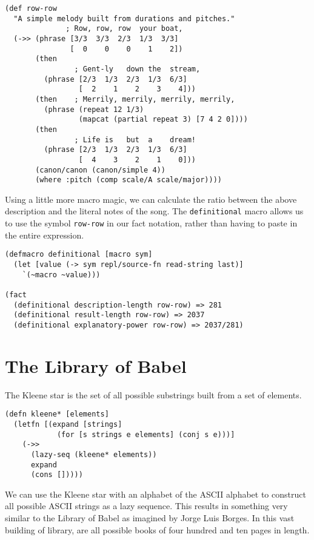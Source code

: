 \documentclass[numbers]{sigplanconf}
\begin{document}
\begin{verbatim}
(def row-row
  "A simple melody built from durations and pitches."
              ; Row, row, row  your boat,
  (->> (phrase [3/3  3/3  2/3  1/3  3/3]
               [  0    0    0    1    2])
       (then
                ; Gent-ly   down the  stream,
         (phrase [2/3  1/3  2/3  1/3  6/3]
                 [  2    1    2    3    4]))
       (then    ; Merrily, merrily, merrily, merrily,
         (phrase (repeat 12 1/3)
                 (mapcat (partial repeat 3) [7 4 2 0])))
       (then
                ; Life is   but  a    dream!
         (phrase [2/3  1/3  2/3  1/3  6/3]
                 [  4    3    2    1    0]))
       (canon/canon (canon/simple 4))
       (where :pitch (comp scale/A scale/major))))
\end{verbatim}

Using a little more macro magic, we can calculate the ratio between the above description and the literal notes
of the song. The \verb|definitional| macro allows us to use the symbol \verb|row-row| in our fact notation, rather than
having to paste in the entire expression.

\begin{verbatim}
(defmacro definitional [macro sym]
  (let [value (-> sym repl/source-fn read-string last)]
    `(~macro ~value)))

(fact
  (definitional description-length row-row) => 281
  (definitional result-length row-row) => 2037
  (definitional explanatory-power row-row) => 2037/281)
\end{verbatim}

\section{The Library of Babel}

The Kleene star is the set of all possible substrings built from a set of elements.

\begin{verbatim}
(defn kleene* [elements]
  (letfn [(expand [strings]
            (for [s strings e elements] (conj s e)))]
    (->>
      (lazy-seq (kleene* elements))
      expand
      (cons []))))
\end{verbatim}

We can use the Kleene star with an alphabet of the ASCII alphabet to construct all possible ASCII strings as a lazy
sequence. This results in something very similar to the Library of Babel as imagined by Jorge Luis Borges. In this
vast building of library, are all possible books of four hundred and ten pages in length.
\end{document}
